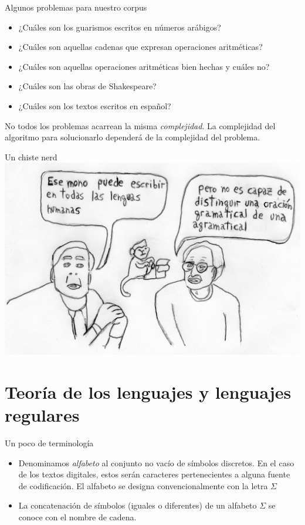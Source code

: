 \documentclass{beamer}
\begin{document}
\begin{frame}{Algunos problemas para nuestro corpus}

\begin{itemize}
\item ¿Cuáles son los guarismos escritos en números arábigos? 
\item ¿Cuáles son aquellas cadenas que expresan operaciones aritméticas?
\item ¿Cuáles son aquellas operaciones aritméticas bien hechas y cuáles no?
\item ¿Cuáles son las obras de Shakespeare?
\item ¿Cuáles son los textos escritos en español?
\end{itemize}

\pause
No todos los problemas acarrean la misma \textit{complejidad}. La complejidad del algoritmo para solucionarlo dependerá de la complejidad del problema.
\end{frame}


\begin{frame}{Un chiste nerd}
\includegraphics[width=\textwidth]{aux/mono.jpg}
\end{frame}

\section{Teoría de los lenguajes y lenguajes regulares}

\begin{frame}{Un poco de terminología}
\begin{itemize}
\item Denominamos \textit{alfabeto} al conjunto no vacío de símbolos discretos. En el caso de los textos digitales, estos serán caracteres pertenecientes a alguna fuente de codificación. El alfabeto se designa convencionalmente con la letra $\Sigma$
\pause
\item La concatenación de símbolos (iguales o diferentes) de un alfabeto $\Sigma$ se conoce con el nombre de cadena.
\end{itemize}
\end{frame}
\end{document}
